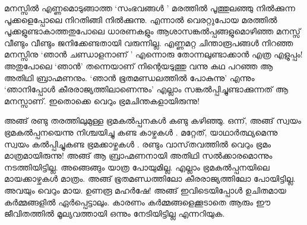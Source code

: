 മനസ്സില്‍ എണ്ണമൊടുങ്ങാത്ത ‘സംഭവങ്ങള്‍ ’ മരത്തില്‍ പൂത്തുലഞ്ഞു നില്‍ക്കുന്ന പൂക്കളെപ്പോലെ നിറതിങ്ങി നില്‍ക്കുന്നു. എന്നാല്‍ വെരറ്റുപോയ മരത്തില്‍ പൂക്കളുണ്ടാകാത്തതുപോലെ ധാരണകളും ആശാസങ്കല്‍പ്പങ്ങളുമൊഴിഞ്ഞ മനസ്സ് വീണ്ടും വീണ്ടും ജനിക്കേണ്ടതായി വരുന്നില്ല. എണ്ണമറ്റ ചിന്താരൂപങ്ങള്‍ നിറഞ്ഞ മനസ്സിനു ‘ഞാന്‍ ചണ്ഡാളനാണ് ’ എന്നൊരു തോന്നലുണ്ടാക്കാന്‍ എത്ര എളുപ്പം! അതുപോലെ ‘ഞാന്‍’ തന്നെയാണ് നിന്റെയടുത്തു വന്നു കഥ പറഞ്ഞ ആ അതിഥി ബ്രാഹ്മണനും. ‘ഞാന്‍ ഭൂതമണ്ഡലത്തില്‍ പോകുന്നു' എന്നും ‘ഞാനിപ്പോള്‍ കീരരാജ്യത്തിലാണെന്നും’ എല്ലാം സങ്കല്‍പ്പിച്ചുണ്ടാക്കുന്നത് ആ മനസ്സാണ്. ഇതൊക്കെ വെറും ഭ്രമചിന്തകളായിരുന്നു! 

അങ്ങ് രണ്ടു തരത്തിലുമുള്ള ഭ്രമകല്‍പ്പനകള്‍ കണ്ടു കഴിഞ്ഞു. ഒന്ന്, അങ്ങ് സ്വയം ഭ്രമകല്‍പ്പനയെന്നു നിശ്ചയിച്ചു കണ്ട കാഴ്ചകള്‍ . മറ്റേത്, യാഥാര്‍ത്ഥ്യമെന്നു സ്വയം കല്‍പ്പിച്ചുകണ്ട ഭ്രമക്കാഴ്ചകള്‍ . രണ്ടും വാസ്‌തവത്തില്‍ വെറും ഭ്രമം മാത്രമായിരുന്നു! അങ്ങ് ആ ബ്രാഹ്മണനായി അതിഥി സല്‍ക്കാരമൊന്നും നടത്തിയിട്ടില്ല. അങ്ങെങ്ങും യാത്ര പോയുമില്ല. എല്ലാം ഭ്രമകല്‍പ്പനയിലെ മായക്കാഴ്ചകള്‍ മാത്രം. അങ്ങ് ഭൂതമണ്ഡത്തിലോ കീരരാജ്യത്തിലോ പോയിട്ടില്ല. അവയും വെറും മായ. ഉണരൂ മഹര്‍ഷേ! അങ്ങ് ഇവിടെയിപ്പോള്‍ ഉചിതമായ കര്‍മ്മങ്ങളില്‍ ഏര്‍പ്പെട്ടാലും. കാരണം കര്‍മ്മങ്ങളെക്കൂടാതെ ആരും ഈ ജീവിതത്തില്‍ മൂല്യവത്തായി ഒന്നും നേടിയിട്ടില്ല എന്നറിയുക.